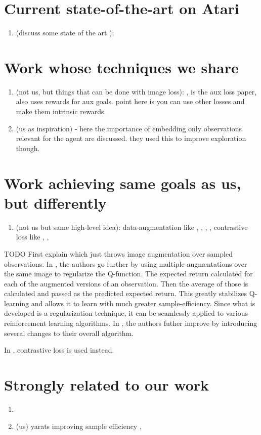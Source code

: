 \section{Current state-of-the-art on Atari}
\begin{enumerate}
		\item (discuss some state of the art ); \cite{agent57}
\end{enumerate}

\section{Work whose techniques we share}
\begin{enumerate}
		\item (not us, but things that can be done with image loss): \cite{lossisitsownreward}, 
				\cite{rlwauxloss} is the aux loss paper, also uses rewards for aux goals.
				point here is you can use other losses and make them intrinsic rewards.
		\item (us as inspiration) \cite{icm} - here the importance of embedding only
				observations relevant for the agent are discussed.
				they used this to improve exploration though.
\end{enumerate}


\section{Work achieving same goals as us, but differently}
\begin{enumerate}
		\item (not us but same high-level idea): data-augmentation like \cite{drqv1},
				\cite{drqv2}, \cite{rad},
\cite{imageaugmentationisallyouneed},
				contrastive loss like \cite{curl}, 
				\cite{flow}, 
				\cite{invariantrepwithoutreconstruction}
\end{enumerate}
TODO
First explain \cite{rad} which just throws image augmentation over sampled observations.
In \cite{drqv1}, the authors go further by using multiple augmentations over the same image
to regularize the Q-function. The expected return calculated for each of the augmented 
versions of an observation. Then the average of those is calculated and passed
as the predicted expected return. This greatly stabilizes Q-learning
and allows it to learn with much greater sample-efficiency.
Since what is developed is a regularization technique, it can
be seamlessly applied to various reinforcement learning algorithms.
In \cite{drqv2}, the authors futher improve \cite{drqv1} by introducing several
changes to their overall algorithm.

In \cite{curl}, contrastive loss is used instead.


\section{Strongly related to our work}
\begin{enumerate}
		\item 
		\item (us) yarats improving sample efficiency \cite{sac+ae}, \cite{laser}
\end{enumerate}

